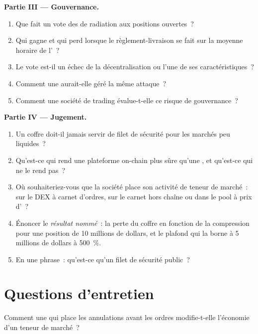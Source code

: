 \begin{problem}
\medskip\noindent\textbf{Partie III --- Gouvernance.}
\begin{enumerate}[resume]
\item Que fait un vote des  de radiation aux positions ouvertes~?
\item Qui gagne et qui perd lorsque le règlement-livraison se fait sur la moyenne horaire de l'~?
\item Le vote est-il un échec de la décentralisation ou l'une de ses caractéristiques~?
\item Comment une  aurait-elle géré la même attaque~?
\item Comment une société de trading évalue-t-elle ce risque de gouvernance~?
\end{enumerate}

\medskip\noindent\textbf{Partie IV --- Jugement.}
\begin{enumerate}[resume]
\item Un coffre doit-il jamais servir de filet de sécurité pour les marchés peu liquides~?
\item Qu'est-ce qui rend une plateforme on-chain plus sûre qu'une , et qu'est-ce qui ne le rend pas~?
\item Où souhaiteriez-vous que la société place son activité de teneur de marché~: sur le DEX à carnet d'ordres, sur le carnet hors chaîne ou dans le pool à prix d'~?
\item Énoncer le \emph{résultat nommé}~: la perte du coffre en fonction de la compression pour une position de 10 millions de dollars, et le plafond qui la borne à 5 millions de dollars à 500~\%.
\item En une phrase~: qu'est-ce qu'un filet de sécurité public~?
\end{enumerate}
\end{problem}

\section{Questions d'entretien}

\begin{interviewq}\label{iq:m3:on-chain-order-books-and-perpetual-dexs:1}
Comment une  qui place les annulations avant les ordres modifie-t-elle l'économie d'un teneur de marché~?
\end{interviewq}

